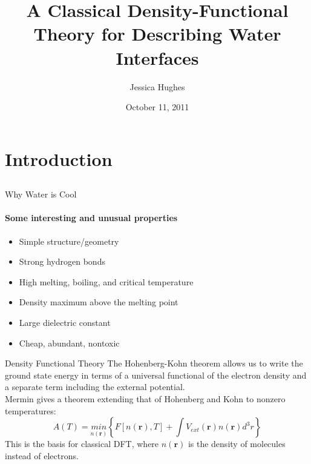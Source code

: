 \documentclass{beamer}
\title{A Classical Density-Functional Theory for Describing Water Interfaces}
\author{Jessica Hughes}
\date{October 11, 2011}
\newcommand{\xx}{\textbf{r}}
\begin{document}
\begin{frame}
  \titlepage
\end{frame}

\section{Introduction}
\subsection*{}

\begin{frame}{Why Water is Cool}
\framesubtitle{Some interesting and unusual properties}
\begin{itemize}
 \item <1-> Simple structure/geometry
 \vspace{0.2cm}
 \item <2-> Strong hydrogen bonds
 \vspace{0.2cm}
 \item <3-> High melting, boiling, and critical temperature 
 \vspace{0.2cm}
 \item <4-> Density maximum above the melting point
 \vspace{0.2cm}
 \item <5-> Large dielectric constant
 \vspace{0.2cm}
 \item <6-> Cheap, abundant, nontoxic
\end{itemize}
\end{frame}

\begin{frame}{Density Functional Theory}
The Hohenberg-Kohn
theorem allows us to write the ground state
energy in terms of a universal functional of the electron density and a separate
term including the external potential. \\
\vspace{0.5cm}
\pause
Mermin gives a
theorem extending that of Hohenberg and Kohn to nonzero temperatures:
\begin{equation}
  A(T) = \underset{n(\xx)}{min}\left\{ F[n(\xx),T] + \int V_{ext}(\xx) n(\xx)
d^3r\right\}
\end{equation}
This is the basis for classical DFT, where $n(\xx)$ is the density of molecules
instead of electrons.
\end{frame}
\end{document}
